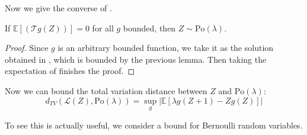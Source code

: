 \documentclass{article}
\begin{document}
Now we give the converse of .

\begin{proposition}\label{prop: direction2 poisson}
    If $\mathbb{E}[(\mathcal{T}g(Z))]=0$ for all $g$ bounded, then $Z\sim \text{Po}(\lambda)$.
\end{proposition}

\begin{proof}
    Since $g$ is an arbitrary bounded function, we take it as the solution obtained in , which is bounded by the previous lemma. Then taking the expectation of  finishes the proof.
\end{proof}

Now we can bound the total variation distance between $Z$ and $\text{Po}(\lambda)$:
\begin{equation*}
    d_{TV}(\mathcal{L}(Z), \text{Po}(\lambda)) = \sup_{g} |\mathbb{E}[\lambda g(Z+1) - Zg(Z)]|
\end{equation*}

To see this is actually useful, we consider a bound for Bernoulli random variables. 
\end{document}
